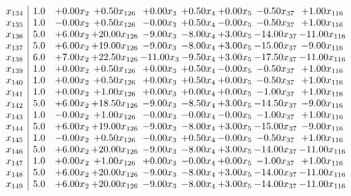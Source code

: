\documentclass[8pt]{article}
\begin{document}
\[\begin{array}{c| c c@{\hskip 2pt} c@{\hskip 2pt} c@{\hskip 2pt} c@{\hskip 2pt} c@{\hskip 2pt} c@{\hskip 2pt} c@{\hskip 2pt} }
 x_{134}   &  1.0 & +  0.00 x_{2} & +  0.50 x_{126} & +  0.00 x_{3} & +  0.50 x_{4} & +  0.00 x_{5} & -0.50 x_{37} & +  1.00 x_{116}\\
 x_{135}   &  1.0 & -0.00 x_{2} & +  0.50 x_{126} & -0.00 x_{3} & +  0.50 x_{4} & -0.00 x_{5} & -0.50 x_{37} & +  1.00 x_{116}\\
 x_{136}   &  5.0 & +  6.00 x_{2} & + 20.00 x_{126} & -9.00 x_{3} & -8.00 x_{4} & +  3.00 x_{5} & -14.00 x_{37} & -11.00 x_{116}\\
 x_{137}   &  5.0 & +  6.00 x_{2} & + 19.00 x_{126} & -9.00 x_{3} & -8.00 x_{4} & +  3.00 x_{5} & -15.00 x_{37} & -9.00 x_{116}\\
 x_{138}   &  6.0 & +  7.00 x_{2} & + 22.50 x_{126} & -11.00 x_{3} & -9.50 x_{4} & +  3.00 x_{5} & -17.50 x_{37} & -11.00 x_{116}\\
 x_{139}   &  1.0 & +  0.00 x_{2} & +  0.50 x_{126} & +  0.00 x_{3} & +  0.50 x_{4} & -0.00 x_{5} & -0.50 x_{37} & +  1.00 x_{116}\\
 x_{140}   &  1.0 & +  0.00 x_{2} & +  0.50 x_{126} & +  0.00 x_{3} & +  0.50 x_{4} & +  0.00 x_{5} & -0.50 x_{37} & +  1.00 x_{116}\\
 x_{141}   &  1.0 & +  0.00 x_{2} & +  1.00 x_{126} & +  0.00 x_{3} & +  0.00 x_{4} & +  0.00 x_{5} & -1.00 x_{37} & +  1.00 x_{116}\\
 x_{142}   &  5.0 & +  6.00 x_{2} & + 18.50 x_{126} & -9.00 x_{3} & -8.50 x_{4} & +  3.00 x_{5} & -14.50 x_{37} & -9.00 x_{116}\\
 x_{143}   &  1.0 & -0.00 x_{2} & +  1.00 x_{126} & -0.00 x_{3} & -0.00 x_{4} & -0.00 x_{5} & -1.00 x_{37} & +  1.00 x_{116}\\
 x_{144}   &  5.0 & +  6.00 x_{2} & + 19.00 x_{126} & -9.00 x_{3} & -8.00 x_{4} & +  3.00 x_{5} & -15.00 x_{37} & -9.00 x_{116}\\
 x_{145}   &  1.0 & -0.00 x_{2} & +  0.50 x_{126} & -0.00 x_{3} & +  0.50 x_{4} & -0.00 x_{5} & -0.50 x_{37} & +  1.00 x_{116}\\
 x_{146}   &  5.0 & +  6.00 x_{2} & + 20.00 x_{126} & -9.00 x_{3} & -8.00 x_{4} & +  3.00 x_{5} & -14.00 x_{37} & -11.00 x_{116}\\
 x_{147}   &  1.0 & +  0.00 x_{2} & +  1.00 x_{126} & +  0.00 x_{3} & -0.00 x_{4} & +  0.00 x_{5} & -1.00 x_{37} & +  1.00 x_{116}\\
 x_{148}   &  5.0 & +  6.00 x_{2} & + 20.00 x_{126} & -9.00 x_{3} & -8.00 x_{4} & +  3.00 x_{5} & -14.00 x_{37} & -11.00 x_{116}\\
 x_{149}   &  5.0 & +  6.00 x_{2} & + 20.00 x_{126} & -9.00 x_{3} & -8.00 x_{4} & +  3.00 x_{5} & -14.00 x_{37} & -11.00 x_{116}\\

\end{array}\]
\end{document}
